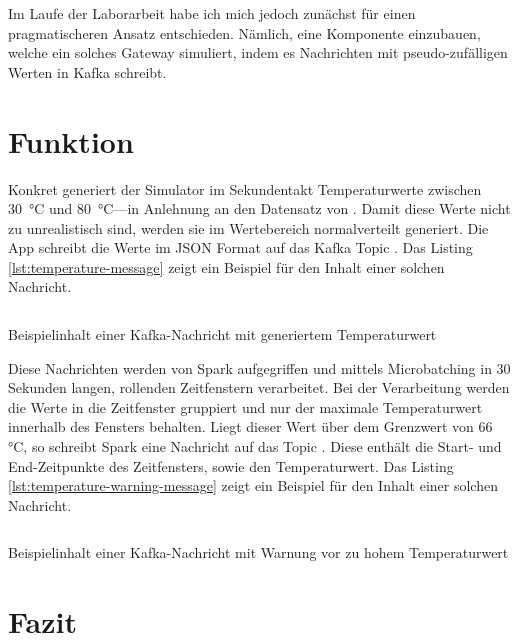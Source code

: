 Im Laufe der Laborarbeit habe ich mich jedoch zunächst für einen pragmatischeren Ansatz entschieden.
Nämlich, eine Komponente einzubauen, welche ein solches Gateway simuliert, indem es Nachrichten mit pseudo-zufälligen Werten in Kafka schreibt.

\section{Funktion}\label{sec:funktion}

Konkret generiert der Simulator im Sekundentakt Temperaturwerte zwischen 30~°C und 80~°C---in Anlehnung an den Datensatz von \cite{helwig_condition_2015}.
Damit diese Werte nicht zu unrealistisch sind, werden sie im Wertebereich normalverteilt generiert.
Die App schreibt die Werte im JSON Format auf das Kafka Topic .
Das Listing \ref{lst:temperature-message} zeigt ein Beispiel für den Inhalt einer solchen Nachricht.

\begin{listing}[H]
  \inputminted{json}{assets/src/temperature-message.json}
  \caption{Beispielinhalt einer Kafka-Nachricht mit generiertem Temperaturwert}\label{lst:temperature-message}
\end{listing}

Diese Nachrichten werden von Spark aufgegriffen und mittels Microbatching in 30 Sekunden langen, rollenden Zeitfenstern verarbeitet.
Bei der Verarbeitung werden die Werte in die Zeitfenster gruppiert und nur der maximale Temperaturwert innerhalb des Fensters behalten.
Liegt dieser Wert über dem Grenzwert von 66 °C, so schreibt Spark eine Nachricht auf das Topic .
Diese enthält die Start- und End-Zeitpunkte des Zeitfensters, sowie den Temperaturwert.
Das Listing \ref{lst:temperature-warning-message} zeigt ein Beispiel für den Inhalt einer solchen Nachricht.

\begin{listing}[H]
  \inputminted{json}{assets/src/temperature-warning-message.json}
  \caption{Beispielinhalt einer Kafka-Nachricht mit Warnung vor zu hohem Temperaturwert}\label{lst:temperature-warning-message}
\end{listing}

\section{Fazit}\label{sec:fazit}
